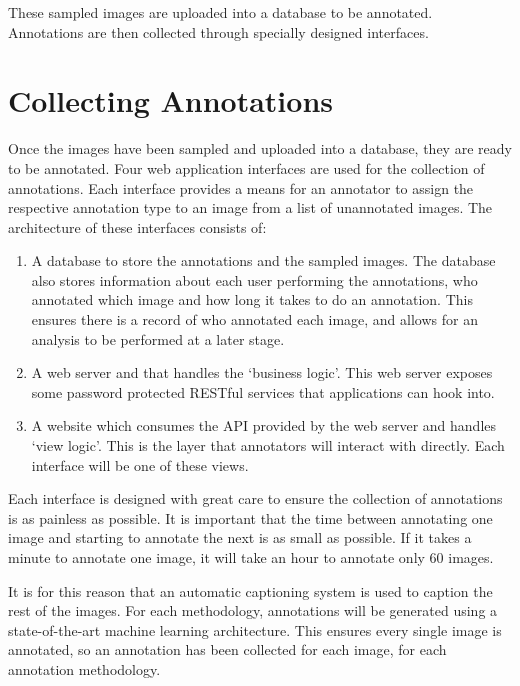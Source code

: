 These sampled images are uploaded into a database to be annotated. Annotations are then collected through specially designed interfaces.

\section{Collecting Annotations}

Once the images have been sampled and uploaded into a database, they are ready to be annotated. Four web application interfaces are used for the collection of annotations. Each interface provides a means for an annotator to assign the respective annotation type to an image from a list of unannotated images. The architecture of these interfaces consists of:
\begin{enumerate}
    \item A database to store the annotations and the sampled images. The database also stores information about each user performing the annotations, who annotated which image and how long it takes to do an annotation. This ensures there is a record of who annotated each image, and allows for an analysis to be performed at a later stage.
    \item A web server and that handles the `business logic'. This web server exposes some password protected RESTful services that applications can hook into.
    \item A website which consumes the API provided by the web server and handles `view logic'. This is the layer that annotators will interact with directly. Each interface will be one of these views.
\end{enumerate}

Each interface is designed with great care to ensure the collection of annotations is as painless as possible. It is important that the time between annotating one image and starting to annotate the next is as small as possible. If it takes a minute to annotate one image, it will take an hour to annotate only 60 images.

It is for this reason that an automatic captioning system is used to caption the rest of the images. For each methodology, annotations will be generated using a state-of-the-art machine learning architecture. This ensures every single image is annotated, so an annotation has been collected for each image, for each annotation methodology.


